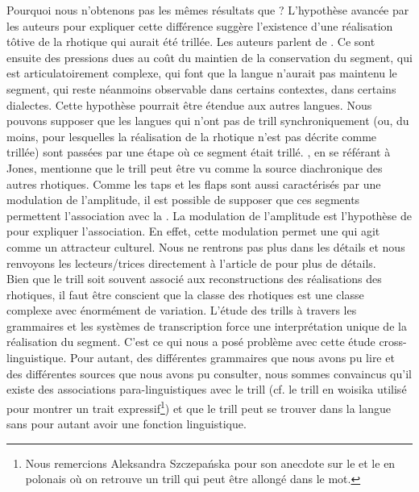 Pourquoi nous n'obtenons pas les mêmes résultats que \textcite{winterTrilledAssociatedRoughness2022} ?
L'hypothèse avancée par les auteurs pour expliquer cette différence suggère l'existence d'une réalisation tôtive de la rhotique qui aurait été trillée. Les auteurs parlent de  \parencite[3]{winterTrilledAssociatedRoughness2022}. Ce sont ensuite des pressions dues au coût du maintien de la conservation du segment, qui est articulatoirement complexe, qui font que la langue n'aurait pas maintenu le segment, qui reste néanmoins observable dans certains contextes, dans certains dialectes.
Cette hypothèse pourrait être étendue aux autres langues.
Nous pouvons supposer que les langues qui n'ont pas de trill synchroniquement (ou, du moins, pour lesquelles la réalisation de la rhotique n'est pas décrite comme trillée) sont passées par une étape où ce segment était trillé.
\textcite[22]{punnooseAuditoryAcousticStudy2010}, en se référant à Jones, mentionne que le trill peut être vu comme la source diachronique des autres rhotiques.
Comme les taps et les flaps sont aussi caractérisés par une modulation de l'amplitude, il est possible de supposer que ces segments permettent l'association avec la . La modulation de l'amplitude est l'hypothèse de \textcite{winterTrilledAssociatedRoughness2022} pour expliquer l'association. En effet, cette modulation permet une  qui agit comme un attracteur culturel. Nous ne rentrons pas plus dans les détails et nous renvoyons les lecteurs/trices directement à l'article de \textcite{winterTrilledAssociatedRoughness2022} pour plus de détails.\\


Bien que le trill soit souvent associé aux reconstructions des réalisations des rhotiques, il faut être conscient  que la classe des rhotiques est une classe complexe avec énormément de variation. L'étude des trills à travers les grammaires et les systèmes de transcription force une interprétation unique de la réalisation du segment. C'est ce qui nous a posé problème avec cette étude cross-linguistique. Pour autant, des différentes grammaires que nous avons pu lire et des différentes sources que nous avons pu consulter, nous sommes convaincus qu'il existe des associations para-linguistiques avec le trill (cf. le trill en woisika  utilisé pour montrer un trait expressif\footnote{Nous remercions Aleksandra Szczepańska pour son anecdote sur le  et le  en polonais où on retrouve un trill qui peut être allongé dans le mot.}) et que le trill peut se trouver dans la langue sans pour autant avoir une fonction linguistique.

